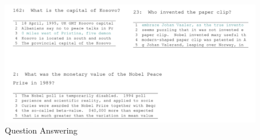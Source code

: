 \begin{figure}
  \center
  \includegraphics[width=.8\textwidth]{res/qa-answers.png}
  \caption{Question Answering}\label{fig:qa-answers}
\end{figure}